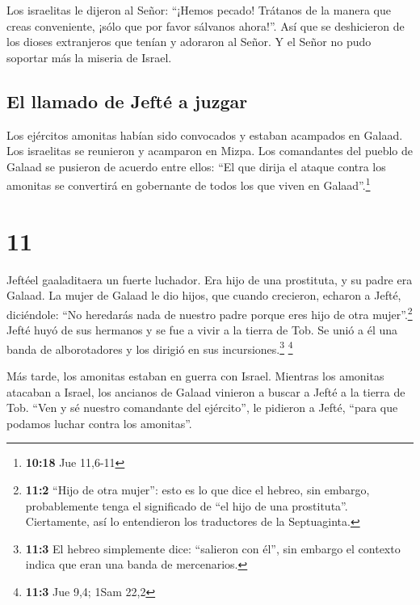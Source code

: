  Los israelitas le dijeron al Señor: ``¡Hemos pecado!
Trátanos de la manera que creas conveniente, ¡sólo que por favor
sálvanos ahora!''.  Así que se deshicieron de los dioses
extranjeros que tenían y adoraron al Señor. Y el Señor no pudo soportar
más la miseria de Israel.

\hypertarget{el-llamado-de-jeftuxe9-a-juzgar}{%
\subsection{El llamado de Jefté a
juzgar}\label{el-llamado-de-jeftuxe9-a-juzgar}}

 Los ejércitos amonitas habían sido convocados y estaban
acampados en Galaad. Los israelitas se reunieron y acamparon en Mizpa.
 Los comandantes del pueblo de Galaad se pusieron de
acuerdo entre ellos: ``El que dirija el ataque contra los amonitas se
convertirá en gobernante de todos los que viven en Galaad''.\footnote{\textbf{10:18}
  Jue 11,6-11}

\hypertarget{section-10}{%
\section{11}\label{section-10}}

 Jeftéel gaaladitaera un fuerte luchador. Era hijo de una
prostituta, y su padre era Galaad.  La mujer de Galaad le
dio hijos, que cuando crecieron, echaron a Jefté, diciéndole: ``No
heredarás nada de nuestro padre porque eres hijo de otra
mujer''.\footnote{\textbf{11:2} ``Hijo de otra mujer'': esto es lo que
  dice el hebreo, sin embargo, probablemente tenga el significado de
  ``el hijo de una prostituta''. Ciertamente, así lo entendieron los
  traductores de la Septuaginta.}  Jefté huyó de sus
hermanos y se fue a vivir a la tierra de Tob. Se unió a él una banda de
alborotadores y los dirigió en sus incursiones.\footnote{\textbf{11:3}
  El hebreo simplemente dice: ``salieron con él'', sin embargo el
  contexto indica que eran una banda de mercenarios.} \footnote{\textbf{11:3}
  Jue 9,4; 1Sam 22,2}

 Más tarde, los amonitas estaban en guerra con Israel.
 Mientras los amonitas atacaban a Israel, los ancianos de
Galaad vinieron a buscar a Jefté a la tierra de Tob. 
``Ven y sé nuestro comandante del ejército'', le pidieron a Jefté,
``para que podamos luchar contra los amonitas''.

